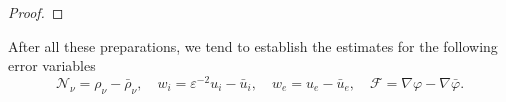 \documentclass[reqno,twoside,12pt,a4paper]{amsart}
\newcommand{\eps}{\mathbb{\varepsilon}}
\newcommand{\al}{\alpha}
\newcommand{\dive}{\mathrm{div}}
\newcommand{\pa}{\partial}
\newcommand{\D}{\nabla}
\newcommand{\vp}{\varphi}
\numberwithin{equation}{section}
\begin{document}
\begin{proof}
\end{proof}

After all these preparations, we tend to establish the estimates for the following error variables
\[
\mathcal{N}_\nu=\rho_\nu-\bar{\rho}_\nu, \quad w_i=\eps^{-2}u_i-\bar{u}_i, \quad w_e=u_e-\bar{u}_e, \quad \mathcal{F}=\D\vp-\D\bar{\vp}. 
\]
\end{document}
